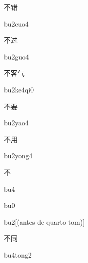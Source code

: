 \begin{verbete}[bu2cuo4]{不错}
\begin{pronuncia}{bu2cuo4}
\end{pronuncia}
\end{verbete}

\begin{verbete}[bu2guo4]{不过}
\begin{pronuncia}{bu2guo4}
\end{pronuncia}
\end{verbete}

\begin{verbete}[bu2ke4qi0]{不客气}
\begin{pronuncia}{bu2ke4qi0}
\end{pronuncia}
\end{verbete}

\begin{verbete}[bu2yao4]{不要}
\begin{pronuncia}{bu2yao4}
\end{pronuncia}
\end{verbete}

\begin{verbete}[bu2yong4]{不用}
\begin{pronuncia}{bu2yong4}
\end{pronuncia}
\end{verbete}

\begin{verbete}[bu4]{不}
\begin{pronuncia}{bu4}
\end{pronuncia}
\begin{pronuncia}{bu0}
\end{pronuncia}
\begin{pronuncia}{bu2}[(antes de quarto tom)]
\end{pronuncia}
\end{verbete}

\begin{verbete}[bu4tong2]{不同}
\begin{pronuncia}{bu4tong2}
\end{pronuncia}
\end{verbete}

